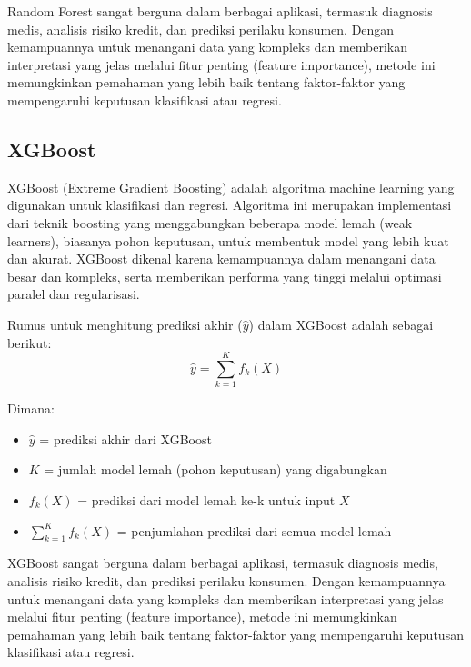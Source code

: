 Random Forest sangat berguna dalam berbagai aplikasi, termasuk diagnosis medis, analisis risiko kredit, dan prediksi perilaku konsumen. Dengan kemampuannya untuk menangani data yang kompleks dan memberikan interpretasi yang jelas melalui fitur penting (feature importance), metode ini memungkinkan pemahaman yang lebih baik tentang faktor-faktor yang mempengaruhi keputusan klasifikasi atau regresi.

\subsection{XGBoost}
XGBoost (Extreme Gradient Boosting) adalah algoritma machine learning yang digunakan untuk klasifikasi dan regresi. Algoritma ini merupakan implementasi dari teknik boosting yang menggabungkan beberapa model lemah (weak learners), biasanya pohon keputusan, untuk membentuk model yang lebih kuat dan akurat. XGBoost dikenal karena kemampuannya dalam menangani data besar dan kompleks, serta memberikan performa yang tinggi melalui optimasi paralel dan regularisasi.

Rumus untuk menghitung prediksi akhir ($\hat{y}$) dalam XGBoost adalah sebagai berikut:
\begin{equation}
    \hat{y} = \sum_{k=1}^{K} f_k(X)
\end{equation}

Dimana:
\begin{itemize}
    \item $\hat{y}$ = prediksi akhir dari XGBoost
    \item $K$ = jumlah model lemah (pohon keputusan) yang digabungkan
    \item $f_k(X)$ = prediksi dari model lemah ke-k untuk input $X$
    \item $\sum_{k=1}^{K} f_k(X)$ = penjumlahan prediksi dari semua model lemah
\end{itemize}

XGBoost sangat berguna dalam berbagai aplikasi, termasuk diagnosis medis, analisis risiko kredit, dan prediksi perilaku konsumen. Dengan kemampuannya untuk menangani data yang kompleks dan memberikan interpretasi yang jelas melalui fitur penting (feature importance), metode ini memungkinkan pemahaman yang lebih baik tentang faktor-faktor yang mempengaruhi keputusan klasifikasi atau regresi.




